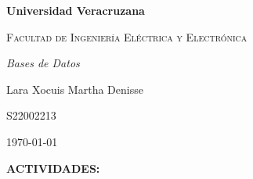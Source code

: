 \documentclass[letterpaper,12pt]{article}
\begin{document}
\thispagestyle{empty}
\newpage
\setcounter{page}{1}
\pagestyle{headings}
\begin{sloppypar} 
    \begin{titlepage}
        \hspace{2.5cm}
        {\bfseries\LARGE Universidad Veracruzana \par}
        \hspace{2cm}
        {\scshape\Large Facultad de Ingeniería Eléctrica y Electrónica \par}
        \begin{center}
            \vspace{7cm}
            {\itshape\huge Bases de Datos \par}
            {\large Lara Xocuis Martha Denisse\par}
            {\large S22002213 \par}
            \vfill
            {\Large \today \par}
        \end{center}
    \end{titlepage} 

\textbf{ACTIVIDADES:}

\end{sloppypar}
\end{document}
